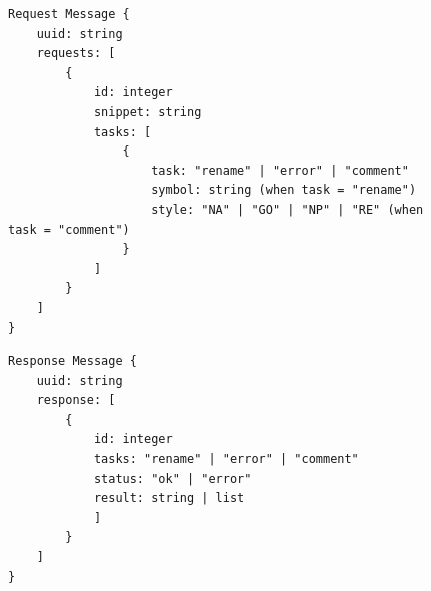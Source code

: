 \capstartfalse
\begin{figure}[H]
  \begin{lstlisting}[caption={The request message data structure. \texttt{uuid} is meant for identification of the message, \texttt{requests} is a list of individual requests, identified with \texttt{id}, which is a serial number of the request, \texttt{snippet} contains the code snippet this request applies to and \texttt{tasks} is a list of task objects, each contains its task type in \texttt{task}, which is either "rename" for the suggestion alternative names to variables, \texttt{error} for fixing errors and \texttt{comment} for inserting additional comments. The field \texttt{symbol} is present only in \texttt{rename} tasks used to specify the name of the variable for renaming, and \texttt{style} is similarly only present in \texttt{comment} tasks and specifies the docstring preference.}, label={lst:request}, numbers=none]
Request Message {
    uuid: string
    requests: [
        {
            id: integer
            snippet: string
            tasks: [
                {
                    task: "rename" | "error" | "comment"
                    symbol: string (when task = "rename")
                    style: "NA" | "GO" | "NP" | "RE" (when task = "comment")
                }
            ]
        }
    ]
}\end{lstlisting}
  \centering
  \begin{lstlisting}[caption={The response message data structure. \texttt{uuid} matches the \texttt{uuid} of the request. \texttt{response} is a list of the individual responses. \texttt{id} and \texttt{task} together match up with their respective field in the request and serve to identify the response. \texttt{status} is meant to signify the result of the task. \texttt{result} contains the output of the task; for comment generation and error correction, this is a string; however, for the renaming task, this is a list where each element represents one rename suggestion and contains both the new name for the variable and the code snippet with the substituted name.}, label={lst:response}, numbers=none]
Response Message {
    uuid: string
    response: [
        {
            id: integer
            tasks: "rename" | "error" | "comment"
            status: "ok" | "error"
            result: string | list
            ]
        }
    ]
}
  \end{lstlisting}
\end{figure}

